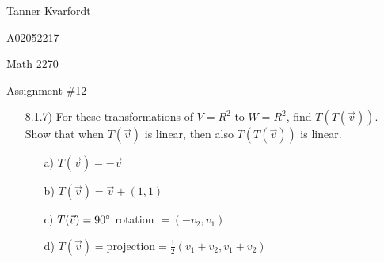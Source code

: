 \documentclass[12pt,pdftex]{article}
\begin{document}
\hfill Tanner Kvarfordt 

\hfill A02052217

\hfill Math 2270

\hfill Assignment \#12

\begin{itemize}
\item[8.1.7)] For these transformations of $V=R^2$ to $W=R^2$, find $T(T(\vec{v}))$. Show that when $T(\vec{v})$ is linear, then also $T(T(\vec{v}))$ is linear.
\begin{itemize}
\item[a)] $T(\vec{v})=-\vec{v}$
\item[b)] $T(\vec{v})=\vec{v}+(1,1)$
\item[c)] $T(\vec{v})=90\degree$ rotation $=(-v_2, v_1)$
\item[d)] $T(\vec{v})=$projection$=\frac{1}{2}(v_1+v_2, v_1+v_2)$
\end{itemize}


\end{itemize}
\end{document}
